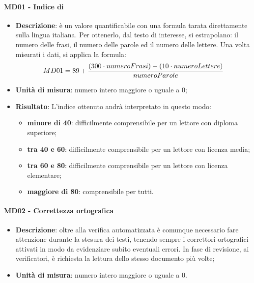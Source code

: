 		\paragraph{MD01 - Indice di }
		\begin{itemize}
			\item \textbf{Descrizione}: è un valore quantificabile con una formula tarata direttamente sulla lingua italiana. Per ottenerlo, dal testo di interesse, si estrapolano: il numero delle frasi, il numero delle parole ed il numero delle lettere.
			Una volta misurati i dati, si applica la formula:
            \[
				MD01 = 89 + {{(300 \cdot numeroFrasi)} - {(10 \cdot numeroLettere)} \over {numeroParole}}
            \]
			\item \textbf{Unità di misura}: numero intero maggiore o uguale a 0;
			\item \textbf{Risultato}: L'indice ottenuto andrà interpretato in questo modo:
			\begin{itemize}
				\item \textbf{minore di 40}: difficilmente comprensibile per un lettore con diploma superiore;
				\item \textbf{tra 40 e 60}: difficilmente comprensibile per un lettore con licenza media;
				\item \textbf{tra 60 e 80}: difficilmente comprensibile per un lettore con licenza elementare;
				\item \textbf{maggiore di 80}: comprensibile per tutti.
			\end{itemize}
		\end{itemize}

		\paragraph{MD02 - Correttezza ortografica}
		\begin{itemize}
			\item \textbf{Descrizione}: oltre alla verifica automatizzata è comunque necessario fare attenzione durante la stesura dei testi, tenendo sempre i correttori ortografici attivati in modo da evidenziare subito eventuali errori. In fase di revisione, ai verificatori, è richiesta la lettura dello stesso documento più volte;
			\item \textbf{Unità di misura}: numero intero maggiore o uguale a 0.
		\end{itemize}
